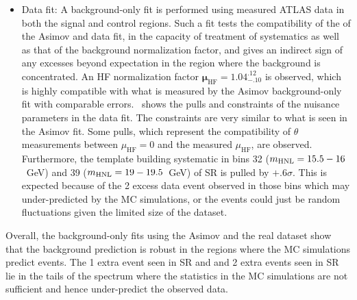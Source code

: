 \begin{itemize}
    \item Data fit: A background-only fit is performed using measured ATLAS data in both the signal and control regions. Such a fit tests the compatibility of the of the Asimov and data fit, in the capacity of treatment of systematics as well as that of the background normalization factor, and gives an indirect sign of any excesses beyond expectation in the region where the background is concentrated. An HF normalization factor $\mathbf{\mu_\mathrm{HF}=1.04^{.12}_{-.10}}$ is observed, which is highly compatible with what is measured by the Asimov background-only fit with comparable errors.~ shows the pulls and constraints of the nuisance parameters in the data fit. The constraints are very similar to what is seen in the Asimov fit. Some pulls, which represent the compatibility of $\theta$ measurements between $\mu_\mathrm{HF}=0$ and the measured $\mu_\mathrm{HF}$, are observed. Furthermore, the template building systematic in bins 32 ($m_{\mathrm{HNL}}=15.5-16$~GeV) and 39 ($m_{\mathrm{HNL}}=19-19.5$~GeV) of SR \euu is pulled by $+.6\sigma$. This is expected because of the 2 excess data event observed in those bins which may under-predicted by the MC simulations, or the events could just be random fluctuations given the limited size of the dataset.
\end{itemize}

Overall, the background-only fits using the Asimov and the real dataset show that the background prediction is robust in the regions where the MC simulations predict events. The 1 extra event seen in SR \eeu and and 2 extra events seen in SR \euu lie in the tails of the \mhnl spectrum where the statistics in the MC simulations are not sufficient and hence under-predict the observed data.